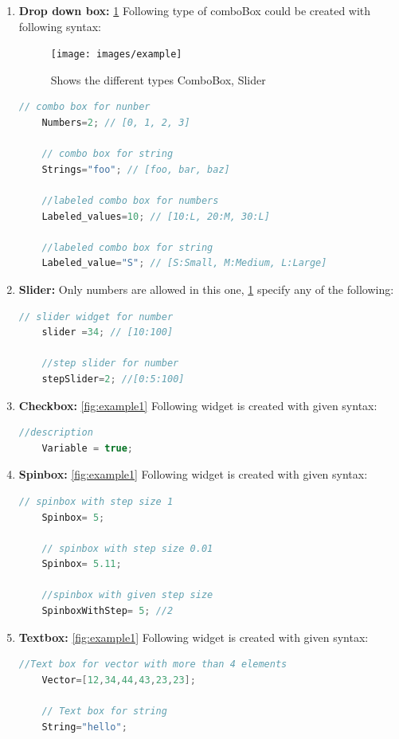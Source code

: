 \documentclass[12pt]{report}
\begin{document}
\begin{enumerate}
	\item \textbf{Drop down box:} \ref{fig:example} Following type of comboBox could be created with following syntax:
	\begin{figure}
		\centering
		\texttt{[image: images/example]}
		\caption{Shows the different types ComboBox, Slider}
		\label{fig:example}
	\end{figure}
	
	\begin{lstlisting}[language=c++]
	// combo box for nunber
	Numbers=2; // [0, 1, 2, 3]
	
	// combo box for string
	Strings="foo"; // [foo, bar, baz]
	
	//labeled combo box for numbers
	Labeled_values=10; // [10:L, 20:M, 30:L]
	
	//labeled combo box for string
	Labeled_value="S"; // [S:Small, M:Medium, L:Large]
	\end{lstlisting}
	\item \textbf{Slider:} Only numbers are allowed in this one, \ref{fig:example} specify any of the following:
	\begin{lstlisting}[language=c++]
	// slider widget for number
	slider =34; // [10:100]
	
	//step slider for number
	stepSlider=2; //[0:5:100]
	\end{lstlisting}
	\item \textbf{Checkbox:} \ref{fig:example1} Following widget is created with given syntax:
	\begin{lstlisting}[language=c++]
	//description
	Variable = true;
	\end{lstlisting}
	\item \textbf{Spinbox:} \ref{fig:example1} Following widget is created with given syntax:
	\begin{lstlisting}[language=c++]
	// spinbox with step size 1
	Spinbox= 5;
	
	// spinbox with step size 0.01
	Spinbox= 5.11;
	
	//spinbox with given step size
	SpinboxWithStep= 5; //2
	\end{lstlisting}
	\item \textbf{Textbox:} \ref{fig:example1} Following widget is created with given syntax:
	\begin{lstlisting}[language=c++]
	//Text box for vector with more than 4 elements
	Vector=[12,34,44,43,23,23];
	
	// Text box for string
	String="hello";
	

\end{lstlisting}
\end{enumerate}
\end{document}
